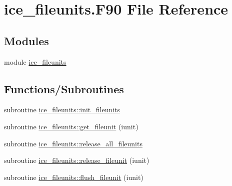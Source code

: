 \hypertarget{ice__fileunits_8F90}{
\section{ice\_\-fileunits.F90 File Reference}
\label{ice__fileunits_8F90}
}
\subsection*{Modules}
\begin{DoxyCompactItemize}
\item 
module \hyperlink{namespaceice__fileunits}{ice\_\-fileunits}
\end{DoxyCompactItemize}
\subsection*{Functions/Subroutines}
\begin{DoxyCompactItemize}
\item 
subroutine \hyperlink{namespaceice__fileunits_adf82bd4005c28d7632bc120150ca5ebc}{ice\_\-fileunits::init\_\-fileunits}
\item 
subroutine \hyperlink{namespaceice__fileunits_ad6283e44cc881fd1d0d6250cbb83a2e2}{ice\_\-fileunits::get\_\-fileunit} (iunit)
\item 
subroutine \hyperlink{namespaceice__fileunits_a6e1bf3b046e5d9d67076539af78445ef}{ice\_\-fileunits::release\_\-all\_\-fileunits}
\item 
subroutine \hyperlink{namespaceice__fileunits_a6edc4f5f2fe087f5651f7d4b7f595eeb}{ice\_\-fileunits::release\_\-fileunit} (iunit)
\item 
subroutine \hyperlink{namespaceice__fileunits_a78c54163676e7d85998ab6bd968c1c52}{ice\_\-fileunits::flush\_\-fileunit} (iunit)
\end{DoxyCompactItemize}
